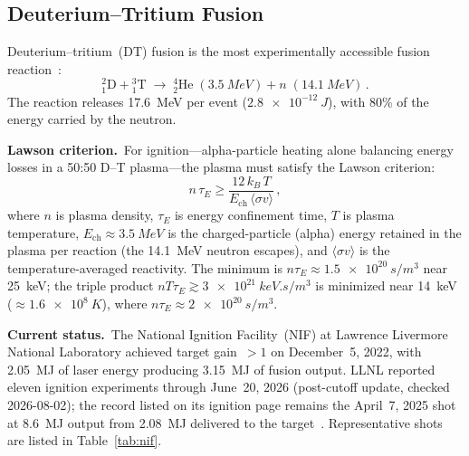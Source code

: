 \documentclass[aps,prd,twocolumn,superscriptaddress,nofootinbib,floatfix]{revtex4-2}
\begin{document}
\subsection{Deuterium--Tritium Fusion}\label{sec:dt-fusion}

Deuterium--tritium~(DT) fusion is the most experimentally accessible fusion
reaction~\cite{DIRD_Winterberg}:
\begin{equation}\label{eq:dt-fusion}
  {}^{2}_{1}\text{D} + {}^{3}_{1}\text{T}
  \;\longrightarrow\;
  {}^{4}_{2}\text{He}\;(\SI{3.5}{MeV}) + n\;(\SI{14.1}{MeV})\,.
\end{equation}
The reaction releases \SI{17.6}{MeV} per event ($\SI{2.8e-12}{J}$), with 80\% of
the energy carried by the neutron.

\textbf{Lawson criterion.}\ For ignition---alpha-particle heating alone balancing
energy losses in a 50:50 D--T plasma---the plasma must satisfy the Lawson
criterion:
\begin{equation}\label{eq:lawson}
  n\,\tau_{E} \ge \frac{12\,k_{B}\,T}{E_{\mathrm{ch}}\,\langle\sigma v\rangle}\,,
\end{equation}
where $n$ is plasma density, $\tau_{E}$ is energy confinement time, $T$ is plasma
temperature, $E_{\mathrm{ch}}\approx\SI{3.5}{MeV}$ is the charged-particle (alpha)
energy retained in the plasma per reaction (the \SI{14.1}{MeV} neutron escapes),
and $\langle\sigma v\rangle$ is the temperature-averaged reactivity. The minimum is
$n\tau_{E}\approx\SI{1.5e20}{s/m^{3}}$ near \SI{25}{keV}; the triple product
$nT\tau_{E}\gtrsim\SI{3e21}{keV.s/m^{3}}$ is minimized near \SI{14}{keV}
(${\approx}\SI{1.6e8}{K}$), where $n\tau_{E}\approx\SI{2e20}{s/m^{3}}$.

\textbf{Current status.}\ The National Ignition Facility~(NIF) at Lawrence
Livermore National Laboratory achieved target gain~$>1$ on December~5, 2022, with
\SI{2.05}{MJ} of laser energy producing \SI{3.15}{MJ} of fusion output. LLNL
reported eleven ignition experiments through June~20, 2026 (post-cutoff update,
checked 2026-08-02); the record listed on its ignition page remains the April~7,
2025 shot at \SI{8.6}{MJ} output from \SI{2.08}{MJ} delivered to the
target~\cite{LLNL_NIF2025}. Representative shots are listed in
Table~\ref{tab:nif}.
\end{document}
